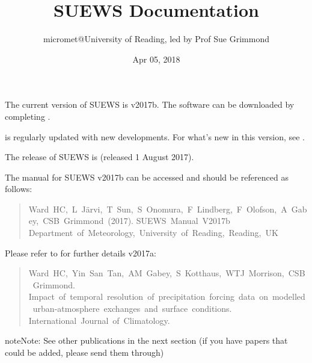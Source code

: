 \documentclass[letterpaper,10pt,english]{sphinxmanual}
\title{SUEWS Documentation}
\date{Apr 05, 2018}
\author{micromet@University of Reading, led by Prof Sue Grimmond}
\begin{document}
\maketitle
\sphinxtableofcontents
{}\label{\detokenize{index::doc}}


The current version of SUEWS is v2017b. The software can be downloaded
by completing .

{\hyperref[\detokenize{index:index-page}]{}} is regularly
updated with new developments. For what’s new in this version, see {\hyperref[\detokenize{version-history:new-latest}]{}}.

The  release of SUEWS is  (released 1 August
2017).

The manual for SUEWS v2017b can be accessed
 and should be referenced as
follows:
\begin{quote}

Ward HC, L Järvi, T Sun, S Onomura, F Lindberg, F Olofson, A Gabey, CSB Grimmond (2017).
SUEWS Manual V2017b Department of Meteorology, University of Reading, Reading, UK
\end{quote}

Please refer to  for
further details v2017a:
\begin{quote}

Ward HC, Yin San Tan, AM Gabey, S Kotthaus, WTJ Morrison, CSB Grimmond.
Impact of temporal resolution of precipitation forcing data on modelled urban-atmosphere exchanges and surface conditions.
International Journal of Climatology.
\end{quote}

\begin{sphinxadmonition}{note}{Note:}
See other publications in the next section (if you have papers that could be added, please send them through)
\end{sphinxadmonition}

\begingroup
{}
\RaggedRight
\end{document}
